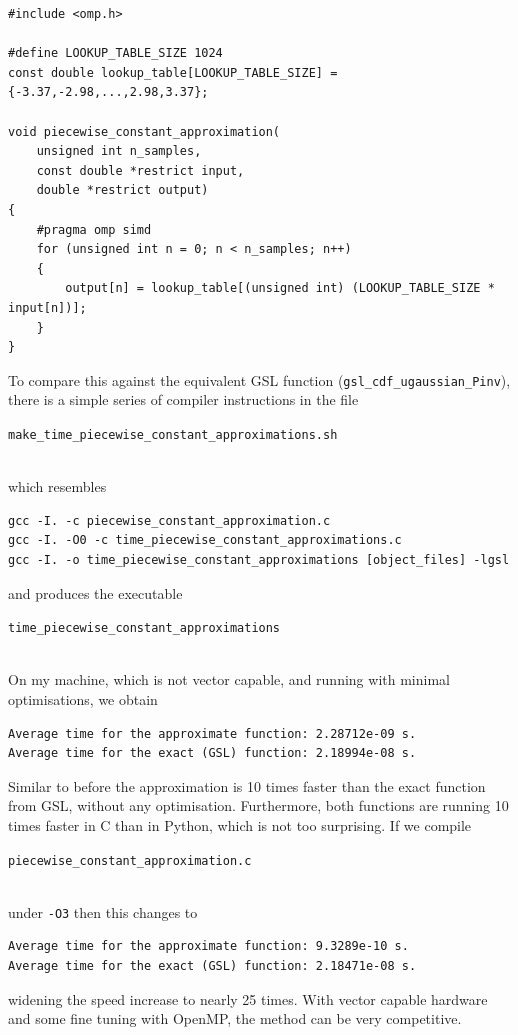 \documentclass[11pt,a4paper,twoside,english]{extarticle}
\newcommand{\singlecodeline}[1]{\\[1em]\centerline{\lstinline[basicstyle=\ttfamily]$#1$}\\[1em]}
\begin{document}
\begin{lstfloat}[htb]
\begin{lstlisting}[style=C, captionpos=b, caption={Constructing a piecewise constant approximation.}, label={code:c:piecewise_constant_approximation}]
#include <omp.h>

#define LOOKUP_TABLE_SIZE 1024
const double lookup_table[LOOKUP_TABLE_SIZE] = {-3.37,-2.98,...,2.98,3.37};

void piecewise_constant_approximation(
    unsigned int n_samples, 
    const double *restrict input, 
    double *restrict output)
{
    #pragma omp simd
    for (unsigned int n = 0; n < n_samples; n++)
    {
        output[n] = lookup_table[(unsigned int) (LOOKUP_TABLE_SIZE * input[n])];
    }
}
\end{lstlisting}
\end{lstfloat}

To compare this against the equivalent GSL function (\verb|gsl_cdf_ugaussian_Pinv|), there is a simple series of compiler instructions in the file \singlecodeline{make_time_piecewise_constant_approximations.sh} which resembles 
\begin{verbatim}
gcc -I. -c piecewise_constant_approximation.c
gcc -I. -O0 -c time_piecewise_constant_approximations.c
gcc -I. -o time_piecewise_constant_approximations [object_files] -lgsl
\end{verbatim}
and produces the executable \singlecodeline{time_piecewise_constant_approximations}

On my machine, which is not vector capable, and running with minimal optimisations, we obtain
\begin{verbatim}
Average time for the approximate function: 2.28712e-09 s.
Average time for the exact (GSL) function: 2.18994e-08 s.
\end{verbatim}
Similar to before the approximation is 10 times faster than the exact function from GSL, without any optimisation. Furthermore, both functions are running 10 times faster in C than in Python, which is not too surprising. If we compile \singlecodeline{piecewise_constant_approximation.c}
under \verb|-O3| then this changes to 
\begin{verbatim}
Average time for the approximate function: 9.3289e-10 s.
Average time for the exact (GSL) function: 2.18471e-08 s.
\end{verbatim}
widening the speed increase to nearly 25 times. With vector capable hardware and some fine tuning with OpenMP, the method can be very competitive. 
\end{document}
